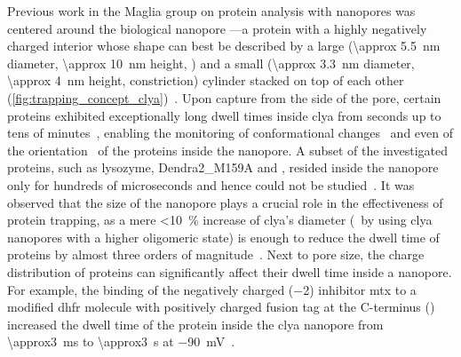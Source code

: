 Previous work in the Maglia group on protein analysis with nanopores was centered around the biological
nanopore ---a protein with a highly negatively charged interior whose shape can best be
described by a large (\SI{\approx 5.5}{\nm} diameter, \SI{\approx 10}{\nm} height, \cisi{} \lumen{}) and a
small (\SI{\approx 3.3}{\nm} diameter, \SI{\approx 4}{\nm} height, \transi{} constriction) cylinder stacked on
top of each other (\cref{fig:trapping_concept_clya})~\cite{Soskine-2012,Soskine-2013}. Upon capture from the
\cisi{} side of the pore, certain proteins exhibited exceptionally long dwell times inside \gls{clya} from
seconds up to tens of
minutes~\cite{Soskine-2012,Soskine-2013,Soskine-Biesemans-2015,Wloka-2017,VanMeervelt-2017,Galenkamp-2018},
enabling the monitoring of conformational changes~\cite{VanMeervelt-2014, Galenkamp-2018,Biesemans-2015} and
even of the orientation~\cite{VanMeervelt-2014} of the proteins inside the nanopore. A subset of the
investigated proteins, such as lysozyme, Dendra2\_M159A and , resided inside the nanopore
\lumen{} only for hundreds of microseconds and hence could not be
studied~\cite{Soskine-2012,Soskine-Biesemans-2015}. It was observed that the size of the nanopore plays a
crucial role in the effectiveness of protein trapping, as a mere \SI{<10}{\percent} increase of \gls{clya}'s
diameter (\ie~by using \gls{clya} nanopores with a higher oligomeric state) is enough to reduce the dwell time
of proteins by almost three orders of magnitude~\cite{Soskine-2013}. Next to pore size, the charge
distribution of proteins can significantly affect their dwell time inside a nanopore. For example, the binding
of the negatively charged (\SI{-2}{\ec}) inhibitor \gls{mtx} to a modified \gls{dhfr} molecule with positively
charged fusion tag at the C-terminus (\DHFRt{}) increased the dwell time of the protein inside the \gls{clya}
nanopore from \SI{\approx3}{\ms} to \SI{\approx3}{\second} at \SI{-90}{\mV}~\cite{Soskine-Biesemans-2015}.

